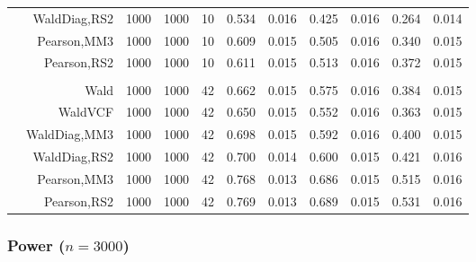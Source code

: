\documentclass[
]{article}
\begin{document}
\begin{table}[H]
{\begin{tabular}[t]{lrrrrrrrlrr}
\hspace{1em} & WaldDiag,RS2 & 1000 & 1000 & 10 & 0.534 & 0.016 & 0.425 & 0.016 & 0.264 & 0.014\\

\hspace{1em} & Pearson,MM3 & 1000 & 1000 & 10 & 0.609 & 0.015 & 0.505 & 0.016 & 0.340 & 0.015\\

\hspace{1em} & Pearson,RS2 & 1000 & 1000 & 10 & 0.611 & 0.015 & 0.513 & 0.016 & 0.372 & 0.015\\
\cmidrule{1-11}
\addlinespace[0.3em]
\multicolumn{11}{l}{\textbf{3F 15V}}\\
\hspace{1em} & Wald & 1000 & 1000 & 42 & 0.662 & 0.015 & 0.575 & 0.016 & 0.384 & 0.015\\

\hspace{1em} & WaldVCF & 1000 & 1000 & 42 & 0.650 & 0.015 & 0.552 & 0.016 & 0.363 & 0.015\\

\hspace{1em} & WaldDiag,MM3 & 1000 & 1000 & 42 & 0.698 & 0.015 & 0.592 & 0.016 & 0.400 & 0.015\\

\hspace{1em} & WaldDiag,RS2 & 1000 & 1000 & 42 & 0.700 & 0.014 & 0.600 & 0.015 & 0.421 & 0.016\\

\hspace{1em} & Pearson,MM3 & 1000 & 1000 & 42 & 0.768 & 0.013 & 0.686 & 0.015 & 0.515 & 0.016\\

\hspace{1em} & Pearson,RS2 & 1000 & 1000 & 42 & 0.769 & 0.013 & 0.689 & 0.015 & 0.531 & 0.016\\
\bottomrule
\end{tabular}}
\endgroup{}
\end{table}

\hypertarget{power-n3000}{%
\subsubsection{\texorpdfstring{Power
(\(n=3000\))}{Power (n=3000)}}\label{power-n3000}}
\end{document}

